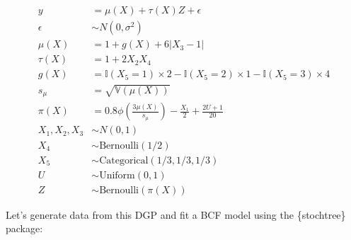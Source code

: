 \documentclass[
  letterpaper,
  DIV=11,
  numbers=noendperiod]{scrreprt}
\begin{document}
\[
\begin{aligned}
y &= \mu(X) + \tau(X) Z + \epsilon\\
\epsilon &\sim N\left(0,\sigma^2\right)\\
\mu(X) &= 1 + g(X) + 6 \lvert X_3 - 1 \rvert\\
\tau(X) &= 1 + 2 X_2 X_4\\
g(X) &= \mathbb{I}(X_5=1) \times 2 - \mathbb{I}(X_5=2) \times 1 - \mathbb{I}(X_5=3) \times 4\\
s_{\mu} &= \sqrt{\mathbb{V}(\mu(X))}\\
\pi(X) &= 0.8 \phi\left(\frac{3\mu(X)}{s_{\mu}}\right) - \frac{X_1}{2} + \frac{2U+1}{20}\\
X_1,X_2,X_3 &\sim N\left(0,1\right)\\
X_4 &\sim \text{Bernoulli}(1/2)\\
X_5 &\sim \text{Categorical}(1/3,1/3,1/3)\\
U &\sim \text{Uniform}\left(0,1\right)\\
Z &\sim \text{Bernoulli}\left(\pi(X)\right)
\end{aligned}
\]

Let's generate data from this DGP and fit a BCF model using the
\{stochtree\} package:
\end{document}
